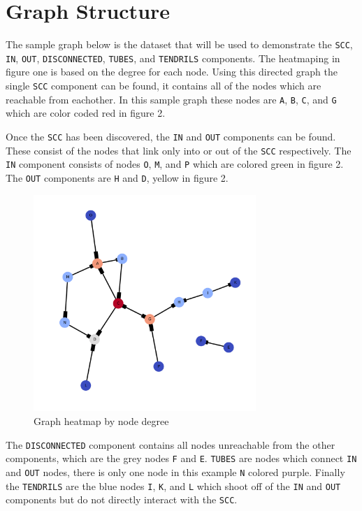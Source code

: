 \documentclass[12pt, a4paper]{article}
\newcommand{\code}[1]{\texttt{#1}}
\begin{document}
\vspace{2em}

\newpage
\section{Graph Structure}

The sample graph below is the dataset that will be used to demonstrate the
\code{SCC}, \code{IN}, \code{OUT}, \code{DISCONNECTED}, \code{TUBES}, and
\code{TENDRILS} components. The heatmaping in figure one is based on the
degree for each node. Using this directed graph the single \code{SCC}
component can be found, it contains all of the nodes which are reachable
from eachother. In this sample graph these nodes are \code{A},
\code{B}, \code{C}, and \code{G} which are color coded red in figure 2.

Once the \code{SCC} has been discovered, the \code{IN} and \code{OUT} components
can be found. These consist of the nodes that link only into or out of the
\code{SCC} respectively. The \code{IN} component consists of nodes
\code{O}, \code{M}, and \code{P} which are colored green in figure 2.
The \code{OUT} components are \code{H} and \code{D}, yellow in figure 2.

\begin{figure}[h]
    \centering
    \caption{Graph heatmap by node degree}
    \includegraphics[width=0.75\textwidth]{dia/graph_heatmap.png}
\end{figure}

The \code{DISCONNECTED} component contains all nodes unreachable from
the other components, which are the grey nodes \code{F} and \code{E}.
\code{TUBES} are nodes which connect \code{IN} and \code{OUT} nodes,
there is only one node in this example \code{N} colored purple.
Finally the \code{TENDRILS} are the blue nodes \code{I}, \code{K},
and \code{L} which shoot off of the \code{IN} and \code{OUT}
components but do not directly interact with the \code{SCC}.
\end{document}
